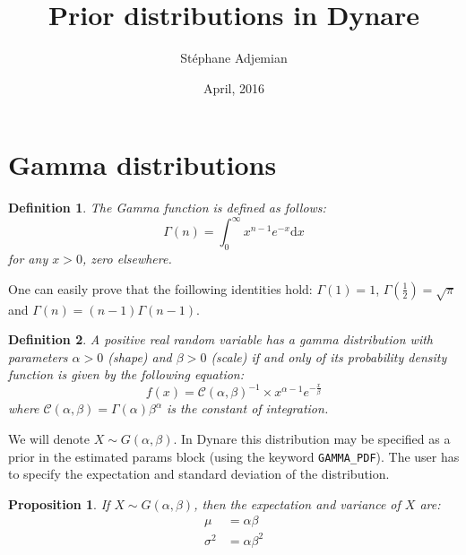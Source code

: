 \documentclass{amsart}
\theoremstyle{plain}
\newtheorem{proposition}{Proposition}[section]
\newtheorem{definition}{Definition}[section]
\theoremstyle{remark}
\numberwithin{equation}{section}
\begin{document}
\title{Prior distributions in Dynare}
\author{Stéphane Adjemian}
\address{Université du Maine}
\date{April, 2016}

\maketitle

\section{Gamma distributions}

\begin{definition}
  The Gamma function is defined as follows:
  \[
    \Gamma(n) = \int_0^{\infty}x^{n-1}e^{-x}\mathrm d x
  \]
  for any $x>0$, zero elsewhere.
\end{definition}

One can easily prove that the foillowing identities hold:
$\Gamma(1) = 1$, $\Gamma\left(\frac{1}{2}\right)=\sqrt{\pi}$ and
$\Gamma(n)=(n-1)\Gamma(n-1)$.

\begin{definition}
  A positive real random variable has a gamma distribution with
  parameters $\alpha>0$ (shape) and $\beta>0$ (scale) if and only of
  its probability density function is given by the following equation:
  \[
    f(x)=\mathcal C(\alpha,\beta)^{-1} \times x^{\alpha-1}e^{-\frac{x}{\beta}}
  \]
  where $\mathcal C(\alpha, \beta) = \Gamma(\alpha)\beta^{\alpha}$ is the constant of
  integration.
\end{definition}
 We will denote $X\sim G(\alpha, \beta)$.  In Dynare this
 distribution may be specified as a prior in the estimated params
 block (using the keyword \verb+GAMMA_PDF+). The user has to specify the
 expectation and standard deviation of the distribution.

 \begin{proposition}
   \label{GammaDistributionMoments}
   If $X\sim G(\alpha, \beta)$, then the expectation and variance of $X$ are:
   \[
     \begin{split}
       \mu &= \alpha\beta \\
       \sigma^2 &= \alpha\beta^2
     \end{split}
   \]
 \end{proposition}
\end{document}

